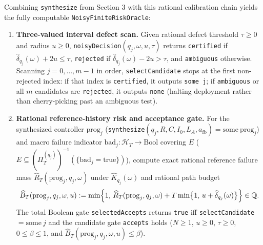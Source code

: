 \documentclass[11pt,a4paper]{article}
\newcounter{none}
\providecommand{\tightlist}{\setlength{\itemsep}{2pt}\setlength{\parskip}{0pt}}
\begin{document}
Combining \texttt{synthesize} from Section 3 with this rational
calibration chain yields the fully computable
\texttt{NoisyFiniteRiskOracle}:

\begin{enumerate}
\def\labelenumi{\arabic{enumi}.}
\tightlist
\item
  \textbf{Three-valued interval defect scan.} Given rational defect
  threshold \(\tau \ge 0\) and radius \(u \ge 0\),
  \texttt{noisyDecision}\((q_j, \omega, u, \tau)\) returns
  \texttt{certified} if
  \(\widehat{\delta}_{q_j}(\omega) + 2u \le \tau\), \texttt{rejected} if
  \(\widehat{\delta}_{q_j}(\omega) - 2u > \tau\), and \texttt{ambiguous}
  otherwise. Scanning \(j = 0, \dots, m-1\) in order,
  \texttt{selectCandidate} stops at the first non-rejected index: if
  that index is \texttt{certified}, it outputs \texttt{some\ j}; if
  \texttt{ambiguous} or all \(m\) candidates are \texttt{rejected}, it
  outputs \texttt{none} (halting deployment rather than cherry-picking
  past an ambiguous test).
\item
  \textbf{Rational reference-history risk and acceptance gate.} For the
  synthesized controller \(\mathrm{prog}_j\)
  (\texttt{synthesize}\((q_j, R, C, I_0, L_A, a_{\mathrm{fb}}) = \mathrm{some\ prog}_j\))
  and macro failure indicator
  \(\mathrm{bad}_j: \mathcal{H}_T \to \mathrm{Bool}\) covering \(E\)
  (\(E \subseteq (\Pi_T^{(q_j)})^{-1}(\{\mathrm{bad}_j = \mathrm{true}\})\)),
  compute exact rational reference failure mass
  \(\widehat{R}_T(\mathrm{prog}_j, q_j, \omega)\) under
  \(\widehat{K}_{q_j}(\omega)\) and rational path budget
  \[\widehat{B}_T(\mathrm{prog}_j, q_j, \omega, u) := \min\Bigl\{1,\, \widehat{R}_T(\mathrm{prog}_j, q_j, \omega) + T \min\bigl\{1,\, u + \widehat{\delta}_{q_j}(\omega)\bigr\}\Bigr\} \in \mathbb{Q}.\]
  The total Boolean gate \texttt{selectedAccepts} returns \texttt{true}
  iff \texttt{selectCandidate} \(= \mathrm{some}\ j\) and the candidate
  gate \texttt{accepts} holds (\(N \ge 1\), \(u \ge 0\), \(\tau \ge 0\),
  \(0 \le \beta \le 1\), and
  \(\widehat{B}_T(\mathrm{prog}_j, q_j, \omega, u) \le \beta\)).
\end{enumerate}

\end{document}
